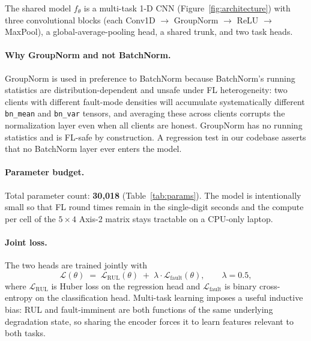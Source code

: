 \documentclass[a4paper,fleqn,doubleblind]{cas-sc}
\begin{document}
The shared model $f_\theta$ is a multi-task 1-D CNN
(Figure~\ref{fig:architecture}) with three convolutional blocks
(each Conv1D $\to$ GroupNorm $\to$ ReLU $\to$ MaxPool), a
global-average-pooling head, a shared trunk, and two task heads.

\paragraph{Why GroupNorm and not BatchNorm.}
GroupNorm is used in preference to BatchNorm because BatchNorm's
running statistics are distribution-dependent and unsafe under FL
heterogeneity: two clients with different fault-mode densities will
accumulate systematically different \texttt{bn\_mean} and
\texttt{bn\_var} tensors, and averaging these across clients
corrupts the normalization layer even when all clients are honest.
GroupNorm has no running statistics and is FL-safe by construction.
A regression test in our codebase asserts that no BatchNorm layer
ever enters the model.

\paragraph{Parameter budget.}
Total parameter count: \textbf{30{,}018} (Table~\ref{tab:params}).
The model is intentionally small so that FL round times remain in
the single-digit seconds and the compute per cell of the
$5 \times 4$ Axis-2 matrix stays tractable on a CPU-only laptop.

\paragraph{Joint loss.}
The two heads are trained jointly with
\begin{equation}
    \mathcal{L}(\theta) \;=\; \mathcal{L}_{\mathrm{RUL}}(\theta) \;+\; \lambda \cdot \mathcal{L}_{\mathrm{fault}}(\theta),
    \qquad \lambda = 0.5,
    \label{eq:loss}
\end{equation}
where $\mathcal{L}_{\mathrm{RUL}}$ is Huber loss on the regression
head and $\mathcal{L}_{\mathrm{fault}}$ is binary cross-entropy on
the classification head. Multi-task learning imposes a useful
inductive bias: RUL and fault-imminent are both functions of the
same underlying degradation state, so sharing the encoder forces it
to learn features relevant to both tasks.
\end{document}
